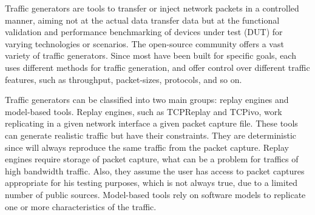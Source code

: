 Traffic generators are tools to transfer or inject network packets in a controlled manner,  aiming not at the actual data transfer data but at the functional validation and performance benchmarking of devices under test (\acrfull{DUT}) for varying technologies or scenarios. The open-source community offers a vast variety of traffic generators. Since most have been built for specific goals,  each uses different methods for traffic generation, and offer control over different traffic features, such as throughput, packet-sizes, protocols, and so on\cite{ditg-paper}. 

Traffic generators can be classified into two main groups: replay engines\cite{sourcesonoff-paper} and model-based tools. Replay engines, such as TCPReplay and TCPivo\cite{tcpivo-paper}, work replicating in a given network interface a given packet capture file. These tools can generate realistic traffic but have their constraints. They are deterministic since will always reproduce the same traffic from the packet capture. Replay engines require storage of packet capture, what can be a problem for traffics of high bandwidth traffic. Also, they assume the user has access to packet captures appropriate for his testing purposes, which is not always true, due to a limited number of public sources. Model-based tools rely on software models to replicate one or more characteristics of the traffic. 


